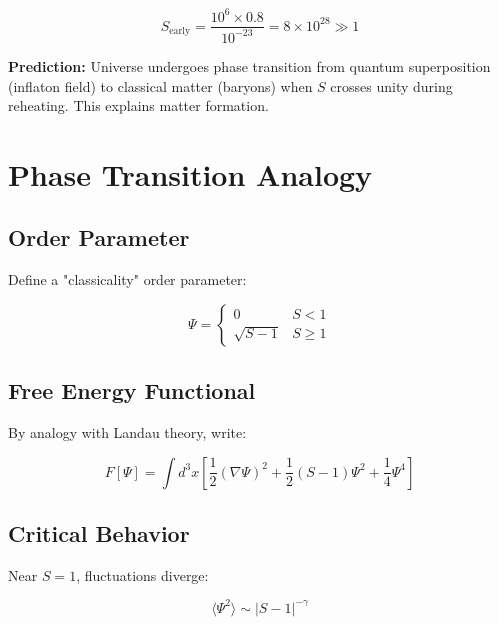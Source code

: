 \documentclass[12pt,a4paper]{article}
\begin{document}
\begin{equation}
S_{\text{early}} = \frac{10^6 \times 0.8}{10^{-23}} = 8 \times 10^{28} \gg 1
\tag{S32}
\end{equation}

\textbf{Prediction:} Universe undergoes phase transition from quantum superposition (inflaton field) to classical matter (baryons) when $S$ crosses unity during reheating. This explains matter formation.

\section{Phase Transition Analogy}

\subsection{Order Parameter}

Define a "classicality" order parameter:

\begin{equation}
\Psi = \begin{cases}
0 & S < 1 \\
\sqrt{S - 1} & S \geq 1
\end{cases}
\tag{S33}
\end{equation}

\subsection{Free Energy Functional}

By analogy with Landau theory, write:

\begin{equation}
F[\Psi] = \int d^3x \left[ \frac{1}{2}(\nabla\Psi)^2 + \frac{1}{2}(S-1)\Psi^2 + \frac{1}{4}\Psi^4 \right]
\tag{S34}
\end{equation}

\subsection{Critical Behavior}

Near $S = 1$, fluctuations diverge:

\begin{equation}
\langle\Psi^2\rangle \sim |S - 1|^{-\gamma}
\tag{S35}
\end{equation}
\end{document}
